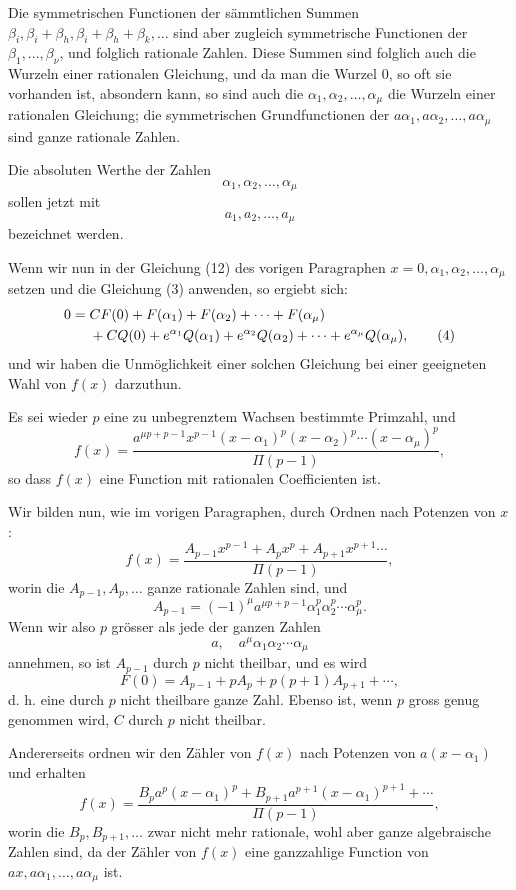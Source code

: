 \documentclass[11pt]{article}
\begin{document}
Die symmetrischen Functionen der sämmtlichen Summen $\beta_i,\beta_i+\beta_h,\beta_i+\beta_h+\beta_k,\ldots$ sind aber zugleich symmetrische Functionen der $\beta_1,\ldots,\beta_\nu$, und folglich rationale Zahlen. Diese Summen sind folglich auch die Wurzeln einer rationalen Gleichung, und da man die Wurzel 0, so oft sie vorhanden ist, absondern kann, so sind auch die $\alpha_1,\alpha_2,\ldots,\alpha_\mu$ die Wurzeln einer rationalen Gleichung; die symmetrischen Grundfunctionen der $a\alpha_1,a\alpha_2,\ldots,a\alpha_\mu$ sind ganze rationale Zahlen.

Die absoluten Werthe der Zahlen
\[
\alpha_1,\alpha_2,\ldots,\alpha_\mu
\]
sollen jetzt mit
\[
a_1,a_2,\ldots,a_\mu
\]
bezeichnet werden.

Wenn wir nun in der Gleichung (12) des vorigen Paragraphen $x=0,\alpha_1,\alpha_2,\ldots,\alpha_\mu$ setzen und die Gleichung (3) anwenden, so ergiebt sich:
\begin{align}
0={}&CF(0)+F(\alpha_1)+F(\alpha_2)+\cdots+F(\alpha_\mu)\notag\\
&+CQ(0)+e^{\alpha_1}Q(\alpha_1)+e^{\alpha_2}Q(\alpha_2)+\cdots+e^{\alpha_\mu}Q(\alpha_\mu),
\tag{4}
\end{align}
und wir haben die Unmöglichkeit einer solchen Gleichung bei einer geeigneten Wahl von $f(x)$ darzuthun.

Es sei wieder $p$ eine zu unbegrenztem Wachsen bestimmte Primzahl, und
\begin{equation}\tag{5}
f(x)=
\frac{a^{\mu p+p-1}x^{p-1}(x-\alpha_1)^p(x-\alpha_2)^p\cdots(x-\alpha_\mu)^p}{\Pi(p-1)},
\end{equation}
so dass $f(x)$ eine Function mit rationalen Coefficienten ist.

Wir bilden nun, wie im vorigen Paragraphen, durch Ordnen nach Potenzen von $x$:
\[
f(x)=\frac{A_{p-1}x^{p-1}+A_px^p+A_{p+1}x^{p+1}\cdots}{\Pi(p-1)},
\]
worin die $A_{p-1},A_p,\ldots$ ganze rationale Zahlen sind, und
\[
A_{p-1}=(-1)^\mu a^{\mu p+p-1}\alpha_1^p\alpha_2^p\cdots\alpha_\mu^p.
\]
Wenn wir also $p$ grösser als jede der ganzen Zahlen
\[
a,\quad a^\mu\alpha_1\alpha_2\cdots\alpha_\mu
\]
annehmen, so ist $A_{p-1}$ durch $p$ nicht theilbar, und es wird
\[
F(0)=A_{p-1}+pA_p+p(p+1)A_{p+1}+\cdots,
\]
d. h. eine durch $p$ nicht theilbare ganze Zahl. Ebenso ist, wenn $p$ gross genug genommen wird, $C$ durch $p$ nicht theilbar.

Andererseits ordnen wir den Zähler von $f(x)$ nach Potenzen von $a(x-\alpha_1)$ und erhalten
\[
f(x)=\frac{B_pa^p(x-\alpha_1)^p+B_{p+1}a^{p+1}(x-\alpha_1)^{p+1}+\cdots}{\Pi(p-1)},
\]
worin die $B_p,B_{p+1},\ldots$ zwar nicht mehr rationale, wohl aber ganze algebraische Zahlen sind, da der Zähler von $f(x)$ eine ganzzahlige Function von $ax,a\alpha_1,\ldots,a\alpha_\mu$ ist.
\end{document}
